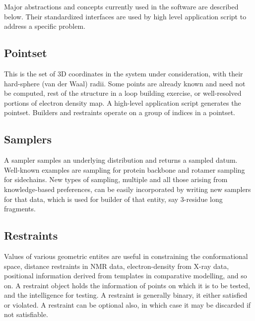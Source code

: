 \documentclass{article}[14pts]
\begin{document}
Major abstractions and concepts currently used in the software are described below. Their standardized interfaces are used by high level application script to address a specific problem.

\subsection{Pointset}
This is the set of 3D coordinates in the system under consideration, with their hard-sphere (van der Waal) radii. Some points are already known and need not be computed, \eg rest of the structure in a loop building exercise, or well-resolved portions of electron density map. A high-level application script generates the pointset. Builders and restraints operate on a group of indices in a pointset.

\subsection{Samplers}
A sampler samples an underlying distribution and returns a sampled datum. Well-known examples are \phipsi sampling for protein backbone and rotamer sampling for sidechains. New types of sampling, \eg multiple \phipsi and all those arising from knowledge-based preferences, can be easily incorporated by writing new samplers for that data, which is used for builder of that entity, say 3-residue long fragments.

\subsection{Restraints}
Values of various geometric entites are useful in constraining the conformational space, \eg distance restraints in NMR data, electron-density from X-ray data, \ca positional information derived from templates in comparative modelling, and so on. A restraint object holds the information of points on which it is to be tested, and the intelligence for testing. A restraint is generally binary, it either satisfied or violated. A restraint can be optional also, in which case it may be discarded if not satisfiable.
\end{document}
